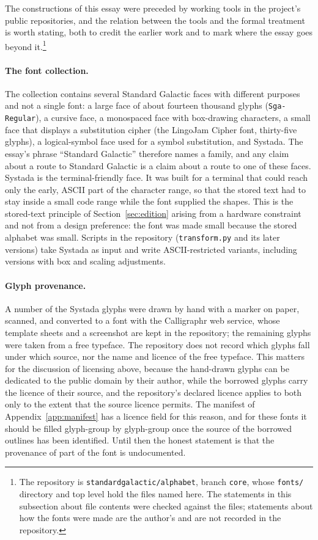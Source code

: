 The constructions of this essay were preceded by working tools in the project's public repositories, and the relation between the tools and the formal treatment is worth stating, both to credit the earlier work and to mark where the essay goes beyond it.\footnote{The repository is \texttt{standardgalactic/alphabet}, branch \texttt{core}, whose \texttt{fonts/} directory and top level hold the files named here. The statements in this subsection about file contents were checked against the files; statements about how the fonts were made are the author's and are not recorded in the repository.}

\paragraph{The font collection.} The collection contains several Standard Galactic faces with different purposes and not a single font: a large face of about fourteen thousand glyphs (\texttt{Sga-Regular}), a cursive face, a monospaced face with box-drawing characters, a small face that displays a substitution cipher (the LingoJam Cipher font, thirty-five glyphs), a logical-symbol face used for a symbol substitution, and Systada. The essay's phrase ``Standard Galactic'' therefore names a family, and any claim about a route to Standard Galactic is a claim about a route to one of these faces. Systada is the terminal-friendly face. It was built for a terminal that could reach only the early, ASCII part of the character range, so that the stored text had to stay inside a small code range while the font supplied the shapes. This is the stored-text principle of Section~\ref{sec:edition} arising from a hardware constraint and not from a design preference: the font was made small because the stored alphabet was small. Scripts in the repository (\texttt{transform.py} and its later versions) take Systada as input and write ASCII-restricted variants, including versions with box and scaling adjustments.

\paragraph{Glyph provenance.} A number of the Systada glyphs were drawn by hand with a marker on paper, scanned, and converted to a font with the Calligraphr web service, whose template sheets and a screenshot are kept in the repository; the remaining glyphs were taken from a free typeface. The repository does not record which glyphs fall under which source, nor the name and licence of the free typeface. This matters for the discussion of licensing above, because the hand-drawn glyphs can be dedicated to the public domain by their author, while the borrowed glyphs carry the licence of their source, and the repository's declared licence applies to both only to the extent that the source licence permits. The manifest of Appendix~\ref{app:manifest} has a licence field for this reason, and for these fonts it should be filled glyph-group by glyph-group once the source of the borrowed outlines has been identified. Until then the honest statement is that the provenance of part of the font is undocumented.

